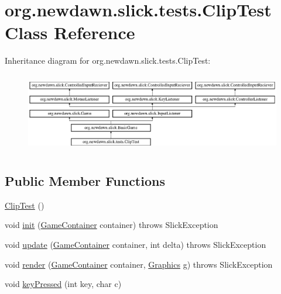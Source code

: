 \hypertarget{classorg_1_1newdawn_1_1slick_1_1tests_1_1_clip_test}{}\section{org.\+newdawn.\+slick.\+tests.\+Clip\+Test Class Reference}
\label{classorg_1_1newdawn_1_1slick_1_1tests_1_1_clip_test}
Inheritance diagram for org.\+newdawn.\+slick.\+tests.\+Clip\+Test\+:\begin{figure}[H]
\begin{center}
\leavevmode
\includegraphics[height=3.522012cm]{classorg_1_1newdawn_1_1slick_1_1tests_1_1_clip_test}
\end{center}
\end{figure}
\subsection*{Public Member Functions}
\begin{DoxyCompactItemize}
\item 
\mbox{\hyperlink{classorg_1_1newdawn_1_1slick_1_1tests_1_1_clip_test_af40320ee7df72425ef9915b48055c543}{Clip\+Test}} ()
\item 
void \mbox{\hyperlink{classorg_1_1newdawn_1_1slick_1_1tests_1_1_clip_test_af5a7bcf3e72268bc2ba84cb8ceda43da}{init}} (\mbox{\hyperlink{classorg_1_1newdawn_1_1slick_1_1_game_container}{Game\+Container}} container)  throws Slick\+Exception 
\item 
void \mbox{\hyperlink{classorg_1_1newdawn_1_1slick_1_1tests_1_1_clip_test_a49f3eb186c2c514c7765f39fa1f481f9}{update}} (\mbox{\hyperlink{classorg_1_1newdawn_1_1slick_1_1_game_container}{Game\+Container}} container, int delta)  throws Slick\+Exception 
\item 
void \mbox{\hyperlink{classorg_1_1newdawn_1_1slick_1_1tests_1_1_clip_test_ac17812bc232e903eae8738751fbeba7d}{render}} (\mbox{\hyperlink{classorg_1_1newdawn_1_1slick_1_1_game_container}{Game\+Container}} container, \mbox{\hyperlink{classorg_1_1newdawn_1_1slick_1_1_graphics}{Graphics}} g)  throws Slick\+Exception 
\item 
void \mbox{\hyperlink{classorg_1_1newdawn_1_1slick_1_1tests_1_1_clip_test_a78a29b4d072cbd0569cfa10c4c46fea6}{key\+Pressed}} (int key, char c)
\end{DoxyCompactItemize}
